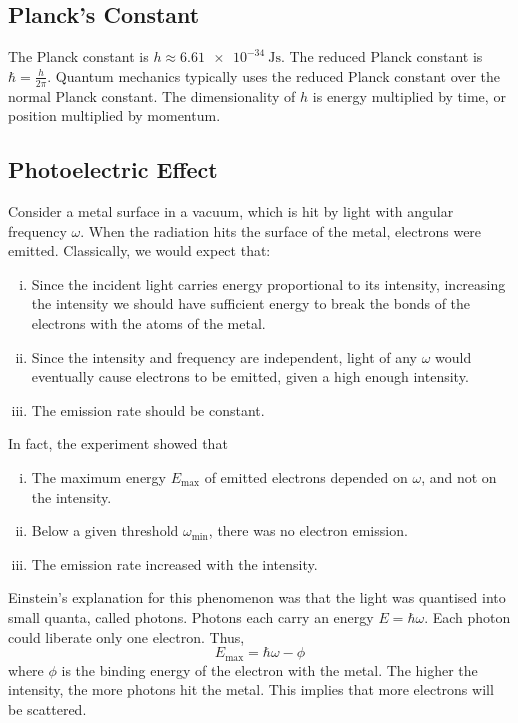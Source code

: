 \subsection{Planck's Constant}
The Planck constant is \( h \approx \SI{6.61e-34}{\joule\second} \).
The reduced Planck constant is \( \hbar = \frac{h}{2\pi} \).
Quantum mechanics typically uses the reduced Planck constant over the normal Planck constant.
The dimensionality of \( h \) is energy multiplied by time, or position multiplied by momentum.

\subsection{Photoelectric Effect}
Consider a metal surface in a vacuum, which is hit by light with angular frequency \( \omega \).
When the radiation hits the surface of the metal, electrons were emitted.
Classically, we would expect that:
\begin{enumerate}[(i)]
\item Since the incident light carries energy proportional to its intensity, increasing the intensity we should have sufficient energy to break the bonds of the electrons with the atoms of the metal.
\item Since the intensity and frequency are independent, light of any \( \omega \) would eventually cause electrons to be emitted, given a high enough intensity.
\item The emission rate should be constant.
\end{enumerate}
In fact, the experiment showed that
\begin{enumerate}[(i)]
\item The maximum energy \( E_{\max} \) of emitted electrons depended on \( \omega \), and not on the intensity.
\item Below a given threshold \( \omega_{\min} \), there was no electron emission.
\item The emission rate increased with the intensity.
\end{enumerate}
Einstein's explanation for this phenomenon was that the light was quantised into small quanta, called photons.
Photons each carry an energy \( E = \hbar \omega \).
Each photon could liberate only one electron.
Thus,
\[ E_{\max} = \hbar \omega - \phi \]
where \( \phi \) is the binding energy of the electron with the metal.
The higher the intensity, the more photons hit the metal.
This implies that more electrons will be scattered.

